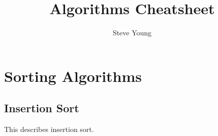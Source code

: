 \documentclass[11pt]{article}
\title{Algorithms Cheatsheet}
\author{Steve Young}
\begin{document}
\maketitle



\section{Sorting Algorithms}

\subsection{Insertion Sort}
This describes insertion sort.


\newpage
\printbibliography[heading=bibintoc]

\end{document}

